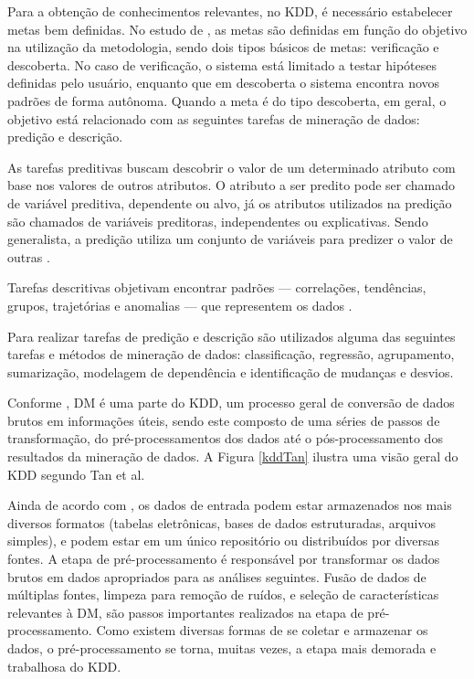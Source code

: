 Para a obtenção de conhecimentos relevantes, no KDD, é necessário estabelecer
metas bem definidas. No estudo de , as metas são
definidas em função do objetivo na utilização da metodologia, sendo dois tipos
básicos de metas: verificação e descoberta. No caso de verificação, o sistema
está limitado a testar hipóteses definidas pelo usuário, enquanto que em
descoberta o sistema encontra novos padrões de forma autônoma. Quando a meta é
do tipo descoberta, em geral, o objetivo está relacionado com as seguintes
tarefas de mineração de dados: predição e descrição.

As tarefas preditivas buscam descobrir o valor de um determinado atributo com
base nos valores de outros atributos. O atributo a ser predito pode ser chamado
de variável preditiva, dependente ou alvo, já os atributos utilizados na
predição são chamados de variáveis preditoras, independentes ou explicativas.
Sendo generalista, a predição utiliza um conjunto de variáveis para predizer o
valor de outras \cite{fayyad1996data}.

Tarefas descritivas objetivam encontrar padrões --- correlações, tendências,
grupos, trajetórias e anomalias --- que representem os dados
\cite{fayyad1996data}.

Para realizar tarefas de predição e descrição são utilizados alguma das
seguintes tarefas e métodos de mineração de dados: classificação, regressão,
agrupamento, sumarização, modelagem de dependência e identificação de mudanças e
desvios.

Conforme , DM é uma parte do KDD, um processo
geral de conversão de dados brutos em informações úteis, sendo este composto de
uma séries de passos de transformação, do pré-processamentos dos dados até o
pós-processamento dos resultados da mineração de dados. A Figura \ref{kddTan}
ilustra uma visão geral do KDD segundo Tan et al.


Ainda de acordo com , os dados de entrada podem
estar armazenados nos mais diversos formatos (tabelas eletrônicas, bases de
dados estruturadas, arquivos simples), e podem estar em um único repositório ou
distribuídos por diversas fontes. A etapa de pré-processamento é responsável por
transformar os dados brutos em dados apropriados para as análises seguintes.
Fusão de dados de múltiplas fontes, limpeza para remoção de ruídos, e seleção de
características relevantes à DM, são passos importantes realizados na etapa de
pré-processamento. Como existem diversas formas de se coletar e armazenar os
dados, o pré-processamento se torna, muitas vezes, a etapa mais demorada e
trabalhosa do KDD.

